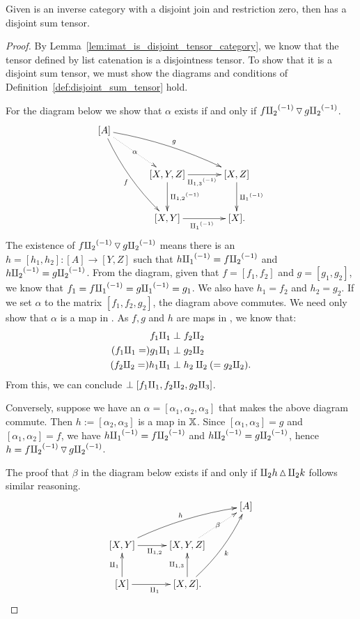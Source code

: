 \begin{lemma}\label{lem:imat_tensor_is_a_disjoint_sum_tensor}
  Given \X is an inverse category with a disjoint join and restriction zero, then \imatx
  has a disjoint sum tensor.
\end{lemma}
\begin{proof}
  By Lemma~\ref{lem:imat_is_disjoint_tensor_category}, we know that the tensor defined by
  list catenation is a disjointness tensor. To show that it is a disjoint sum tensor, we must
  show the diagrams and conditions of Definition~\ref{def:disjoint_sum_tensor} hold.

  For the diagram below we show that $\alpha$ exists if and only if
  $f{\amalg_{2}}^{(-1)} \operatorname{\triangledown} g{\amalg_{2}}^{(-1)}$.
  \begin{align*}
    \xymatrix@C+10pt@R+5pt{
      [A] \ar@/_/[ddr]_f \ar@/^/[drr]^g \ar@{.>}[dr]|-{\alpha} \\
        & [X,Y,Z] \ar[d]^{\icp{1,2}} \ar[r]_{\icp{1,3}} & [X,Z] \ar[d]^{\icpa} \\
        & [X,Y] \ar[r]_{\icpa} & [X].
    }
  \end{align*}
  The existence of $f{\amalg_{2}}^{(-1)} \operatorname{\triangledown} g{\amalg_{2}}^{(-1)}$ means there is an $h = [h_1,h_2]: [A]\to[Y,Z]$ such that
  $h{\amalg_{1}}^{(-1)} = f{\amalg_{2}}^{(-1)}$ and $h{\amalg_{2}}^{(-1)} = g{\amalg_{2}}^{(-1)}$. From the diagram, given that $f = [f_1,f_2]$ and
  $g = [g_1,g_2]$, we know that $f_1 = f{\amalg_{1}}^{(-1)} = g{\amalg_{1}}^{(-1)} = g_1$. We also have $h_1 = f_2$ and
  $h_2 = g_2$. If we set $\alpha$ to the matrix $[f_1,f_2,g_2]$, the diagram above commutes.
  We need only show that $\alpha$ is a map in \imatx. As $f, g$ and $h$ are maps in
  \imatx, we know that:
  \begin{align*}
    f_1\amalg_{1} & \perp f_2 \amalg_{2}\\
    (f_1\amalg_{1} =) g_1\amalg_{1} & \perp g_2 \amalg_{2}\\
    (f_2 \amalg_{2} =) h_1\amalg_{1} & \perp h_2 \amalg_{2} (= g_2 \amalg_{2}).\\
  \end{align*}
  From this, we can conclude $\perp [f_1 \amalg_{1}, f_2 \amalg_{2}, g_2 \amalg_{3}]$.

  Conversely, suppose we have an $\alpha = [\alpha_1, \alpha_2, \alpha_3]$ that makes the
  above diagram commute. Then  $h := [\alpha_2, \alpha_3]$ is a map in $\mathbb{X}$.
  Since $[\alpha_1,\alpha_3] = g$ and $[\alpha_1,\alpha_2] = f$, we have
  $h{\amalg_{1}}^{(-1)} = f{\amalg_{2}}^{(-1)}$ and $h{\amalg_{2}}^{(-1)} = g{\amalg_{2}}^{(-1)}$, hence $h = f{\amalg_{2}}^{(-1)} \operatorname{\triangledown} g{\amalg_{2}}^{(-1)}$.

  The proof that $\beta$ in the diagram below exists if and only if $\amalg_{2}h\operatorname{\vartriangle} \amalg_{2}k$
  follows similar reasoning.
  \[
    \xymatrix@C+5pt{
        &&[A] \\
         [X,Y] \ar[r]_{\cp{1,2}} \ar@/^/[urr]^h &[X,Y,Z] \ar@{.>}[ur]|-{\beta} \\
         [X] \ar[u]^{\cpa} \ar[r]_{\cpa} & [X,Z]. \ar[u]^{\cp{1,3}} \ar@/_/[uur]_k
    }
  \]
\end{proof}


